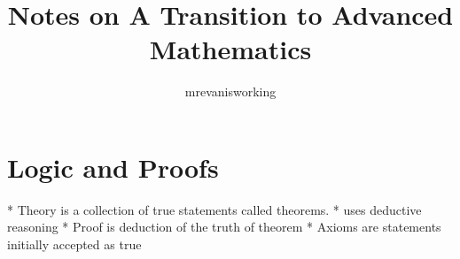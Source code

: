 \documentclass[14pt]{article}
\title{Notes on A Transition to Advanced Mathematics}
\author{mrevanisworking}
\begin{document}
\section{Logic and Proofs}
* Theory is a collection of true statements called theorems.
    * uses deductive reasoning
* Proof is deduction of the truth of theorem
* Axioms are statements initially accepted as true
\end{document}
